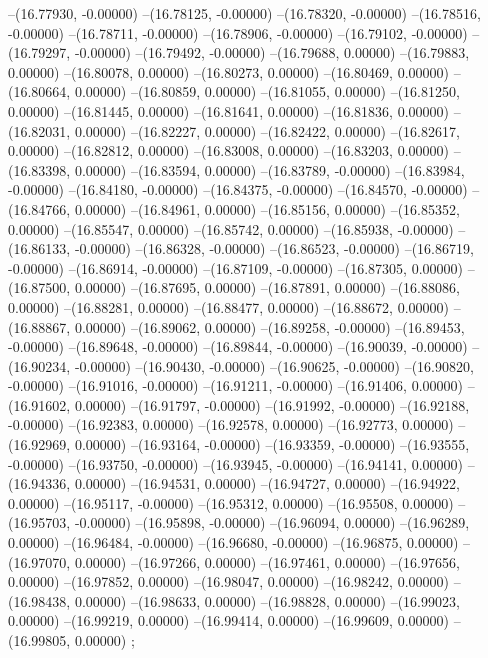 --(16.77930, -0.00000)
--(16.78125, -0.00000)
--(16.78320, -0.00000)
--(16.78516, -0.00000)
--(16.78711, -0.00000)
--(16.78906, -0.00000)
--(16.79102, -0.00000)
--(16.79297, -0.00000)
--(16.79492, -0.00000)
--(16.79688, 0.00000)
--(16.79883, 0.00000)
--(16.80078, 0.00000)
--(16.80273, 0.00000)
--(16.80469, 0.00000)
--(16.80664, 0.00000)
--(16.80859, 0.00000)
--(16.81055, 0.00000)
--(16.81250, 0.00000)
--(16.81445, 0.00000)
--(16.81641, 0.00000)
--(16.81836, 0.00000)
--(16.82031, 0.00000)
--(16.82227, 0.00000)
--(16.82422, 0.00000)
--(16.82617, 0.00000)
--(16.82812, 0.00000)
--(16.83008, 0.00000)
--(16.83203, 0.00000)
--(16.83398, 0.00000)
--(16.83594, 0.00000)
--(16.83789, -0.00000)
--(16.83984, -0.00000)
--(16.84180, -0.00000)
--(16.84375, -0.00000)
--(16.84570, -0.00000)
--(16.84766, 0.00000)
--(16.84961, 0.00000)
--(16.85156, 0.00000)
--(16.85352, 0.00000)
--(16.85547, 0.00000)
--(16.85742, 0.00000)
--(16.85938, -0.00000)
--(16.86133, -0.00000)
--(16.86328, -0.00000)
--(16.86523, -0.00000)
--(16.86719, -0.00000)
--(16.86914, -0.00000)
--(16.87109, -0.00000)
--(16.87305, 0.00000)
--(16.87500, 0.00000)
--(16.87695, 0.00000)
--(16.87891, 0.00000)
--(16.88086, 0.00000)
--(16.88281, 0.00000)
--(16.88477, 0.00000)
--(16.88672, 0.00000)
--(16.88867, 0.00000)
--(16.89062, 0.00000)
--(16.89258, -0.00000)
--(16.89453, -0.00000)
--(16.89648, -0.00000)
--(16.89844, -0.00000)
--(16.90039, -0.00000)
--(16.90234, -0.00000)
--(16.90430, -0.00000)
--(16.90625, -0.00000)
--(16.90820, -0.00000)
--(16.91016, -0.00000)
--(16.91211, -0.00000)
--(16.91406, 0.00000)
--(16.91602, 0.00000)
--(16.91797, -0.00000)
--(16.91992, -0.00000)
--(16.92188, -0.00000)
--(16.92383, 0.00000)
--(16.92578, 0.00000)
--(16.92773, 0.00000)
--(16.92969, 0.00000)
--(16.93164, -0.00000)
--(16.93359, -0.00000)
--(16.93555, -0.00000)
--(16.93750, -0.00000)
--(16.93945, -0.00000)
--(16.94141, 0.00000)
--(16.94336, 0.00000)
--(16.94531, 0.00000)
--(16.94727, 0.00000)
--(16.94922, 0.00000)
--(16.95117, -0.00000)
--(16.95312, 0.00000)
--(16.95508, 0.00000)
--(16.95703, -0.00000)
--(16.95898, -0.00000)
--(16.96094, 0.00000)
--(16.96289, 0.00000)
--(16.96484, -0.00000)
--(16.96680, -0.00000)
--(16.96875, 0.00000)
--(16.97070, 0.00000)
--(16.97266, 0.00000)
--(16.97461, 0.00000)
--(16.97656, 0.00000)
--(16.97852, 0.00000)
--(16.98047, 0.00000)
--(16.98242, 0.00000)
--(16.98438, 0.00000)
--(16.98633, 0.00000)
--(16.98828, 0.00000)
--(16.99023, 0.00000)
--(16.99219, 0.00000)
--(16.99414, 0.00000)
--(16.99609, 0.00000)
--(16.99805, 0.00000)
;
